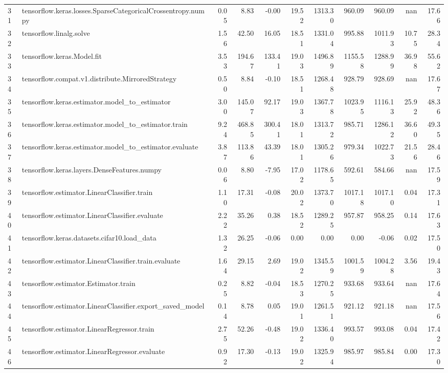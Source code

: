 \begin{tabular}{llrrrrrrrrr}
31 & tensorflow.keras.losses.SparseCategoricalCrossentropy.numpy & 0.05 & 8.83 & -0.00 & 19.52 & 1313.30 & 960.09 & 960.09 & nan & 17.66 \\
32 & tensorflow.linalg.solve & 1.56 & 42.50 & 16.05 & 18.51 & 1331.04 & 995.88 & 1011.93 & 10.75 & 28.34 \\
33 & tensorflow.keras.Model.fit & 3.53 & 194.67 & 133.41 & 19.03 & 1496.89 & 1155.58 & 1288.99 & 36.98 & 55.62 \\
34 & tensorflow.compat.v1.distribute.MirroredStrategy & 0.50 & 8.84 & -0.10 & 18.51 & 1268.48 & 928.79 & 928.69 & nan & 17.67 \\
35 & tensorflow.keras.estimator.model_to_estimator & 3.00 & 145.07 & 92.17 & 19.03 & 1367.78 & 1023.95 & 1116.13 & 25.92 & 48.36 \\
36 & tensorflow.keras.estimator.model_to_estimator.train & 9.24 & 468.85 & 300.41 & 18.01 & 1313.72 & 985.71 & 1286.12 & 36.60 & 49.35 \\
37 & tensorflow.keras.estimator.model_to_estimator.evaluate & 3.87 & 113.86 & 43.39 & 18.01 & 1305.26 & 979.34 & 1022.73 & 21.56 & 28.46 \\
38 & tensorflow.keras.layers.DenseFeatures.numpy & 0.06 & 8.80 & -7.95 & 17.02 & 1178.65 & 592.61 & 584.66 & nan & 17.59 \\
39 & tensorflow.estimator.LinearClassifier.train & 1.10 & 17.31 & -0.08 & 20.02 & 1373.70 & 1017.18 & 1017.10 & 0.04 & 17.31 \\
40 & tensorflow.estimator.LinearClassifier.evaluate & 2.22 & 35.26 & 0.38 & 18.52 & 1289.25 & 957.87 & 958.25 & 0.14 & 17.63 \\
41 & tensorflow.keras.datasets.cifar10.load_data & 1.32 & 26.25 & -0.06 & 0.00 & 0.00 & 0.00 & -0.06 & 0.02 & 17.50 \\
42 & tensorflow.estimator.LinearClassifier.train.evaluate & 1.64 & 29.15 & 2.69 & 19.02 & 1345.59 & 1001.59 & 1004.28 & 3.56 & 19.43 \\
43 & tensorflow.estimator.Estimator.train & 0.25 & 8.82 & -0.04 & 18.53 & 1270.25 & 933.68 & 933.64 & nan & 17.64 \\
44 & tensorflow.estimator.LinearClassifier.export_saved_model & 0.14 & 8.78 & 0.05 & 19.01 & 1261.51 & 921.12 & 921.18 & nan & 17.56 \\
45 & tensorflow.estimator.LinearRegressor.train & 2.75 & 52.26 & -0.48 & 19.02 & 1336.40 & 993.57 & 993.08 & 0.04 & 17.42 \\
46 & tensorflow.estimator.LinearRegressor.evaluate & 0.92 & 17.30 & -0.13 & 19.02 & 1325.94 & 985.97 & 985.84 & 0.00 & 17.30 \\

\end{tabular}
